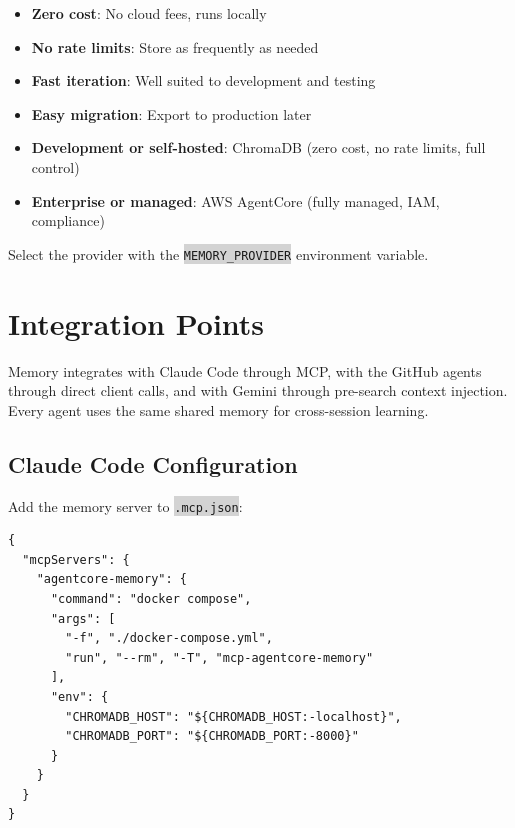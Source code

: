\documentclass[11pt,letterpaper]{article}
\newcommand{\code}[1]{\texttt{\small\colorbox{lightgray}{#1}}}
\begin{document}
\begin{tipbox}
\begin{itemize}
  \item \textbf{Zero cost}: No cloud fees, runs locally
  \item \textbf{No rate limits}: Store as frequently as needed
  \item \textbf{Fast iteration}: Well suited to development and testing
  \item \textbf{Easy migration}: Export to production later
\end{itemize}
\end{tipbox}

\begin{keybox}
\begin{itemize}
  \item \textbf{Development or self-hosted}: ChromaDB (zero cost, no rate limits, full control)
  \item \textbf{Enterprise or managed}: AWS AgentCore (fully managed, IAM, compliance)
\end{itemize}
Select the provider with the \code{MEMORY\_PROVIDER} environment variable.
\end{keybox}

\section{Integration Points}

\begin{tldrbox}
Memory integrates with Claude Code through MCP, with the GitHub agents through direct client calls, and with Gemini through pre-search context injection. Every agent uses the same shared memory for cross-session learning.
\end{tldrbox}

\subsection{Claude Code Configuration}

Add the memory server to \code{.mcp.json}:

\begin{lstlisting}[caption={MCP configuration for Claude Code}, language={}]
{
  "mcpServers": {
    "agentcore-memory": {
      "command": "docker compose",
      "args": [
        "-f", "./docker-compose.yml",
        "run", "--rm", "-T", "mcp-agentcore-memory"
      ],
      "env": {
        "CHROMADB_HOST": "${CHROMADB_HOST:-localhost}",
        "CHROMADB_PORT": "${CHROMADB_PORT:-8000}"
      }
    }
  }
}
\end{lstlisting}
\end{document}
